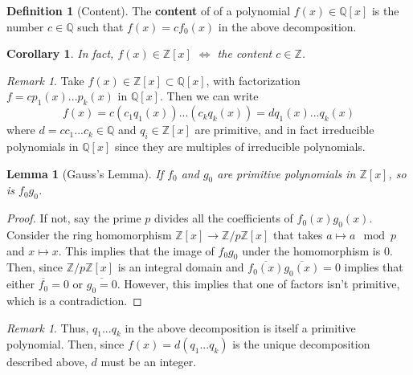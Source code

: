 \documentclass[12pt]{article}
\newtheorem{lem}[thm]{Lemma}  %
\newtheorem{cor}[thm]{Corollary}
\theoremstyle{definition}
\newtheorem{defn}[thm]{Definition}
\theoremstyle{remark}
\newtheorem{rmk}[thm]{Remark}
\numberwithin{equation}{section}
\newcommand\Z{\mathbb Z}    %
\newcommand\Q{\mathbb Q}    %
\newcommand\B[1]{\textbf{ #1}}
\begin{document}
\vspace{15pt}

\begin{defn}[Content]
        The \B{content} of of a polynomial $f(x) \in \Q[x]$ is the number $c \in \Q$ such that $f(x) = cf_0(x)$ in the above decomposition.
\end{defn}


\vspace{15pt}

\begin{cor}
        In fact, $f(x) \in \Z[x]$ $\iff$ the content $c \in \Z$.
\end{cor}

\vspace{15pt}

\begin{rmk}
        Take $f(x) \in \Z[x] \subset \Q[x]$, with factorization $f = cp_1(x)...p_k(x)$ in $\Q[x]$. Then we can write \begin{equation}
                f(x) = c(c_1q_1(x))...(c_kq_k(x)) = dq_1(x)...q_k(x)
        \end{equation}
        where $d = cc_1...c_k \in \Q$ and $q_i \in \Z[x]$ are primitive, and in fact irreducible polynomials in $\Q[x]$ since they are multiples of irreducible polynomials.
\end{rmk}

\vspace{15pt}


\begin{lem}[Gauss's Lemma]
        If $f_0$ and $g_0$ are primitive polynomials in $\Z[x]$, so is $f_0g_0$.
\end{lem}
\begin{proof}
        If not, say the prime $p$ divides all the coefficients of $f_0(x)g_0(x)$. Consider the ring homomorphism $\Z[x] \rightarrow \Z/p\Z[x]$ that takes $a \mapsto a \mod p$ and $x \mapsto x$. This implies that the image of $f_0g_0$ under the homomorphism is $0$. Then, since $\Z/p\Z[x]$ is an integral domain and $\overline{f_0(x)}\overline{g_0(x)} = 0$ implies that either $\overline{f_0} = 0$ or $\overline{g_0 = 0}$. However, this implies that one of factors isn't primitive, which is a contradiction.
\end{proof}



\vspace{15pt}

\begin{rmk}
        Thus, $q_1...q_k$ in the above decomposition is itself a primitive polynomial. Then, since $f(x) = d(q_1...q_k)$ is the unique decomposition described above, $d$ must be an integer.
\end{rmk}
\end{document}
